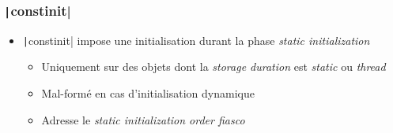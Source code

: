 \documentclass[C++.tex]{subfiles}
\begin{document}
\begin{frame}[fragile]

\end{frame}

\begin{frame}[fragile]
	\frametitle{\texttt|constinit|}
	\begin{itemize}
		\item \texttt|constinit| impose une initialisation durant la phase \textit{static initialization}
		\begin{itemize}
			\item Uniquement sur des objets dont la \textit{storage duration} est \textit{static} ou \textit{thread}
			\item Mal-formé en cas d'initialisation dynamique
			\item Adresse le \textit{static initialization order fiasco}
		\end{itemize}
	\end{itemize}

\end{frame}
\end{document}
